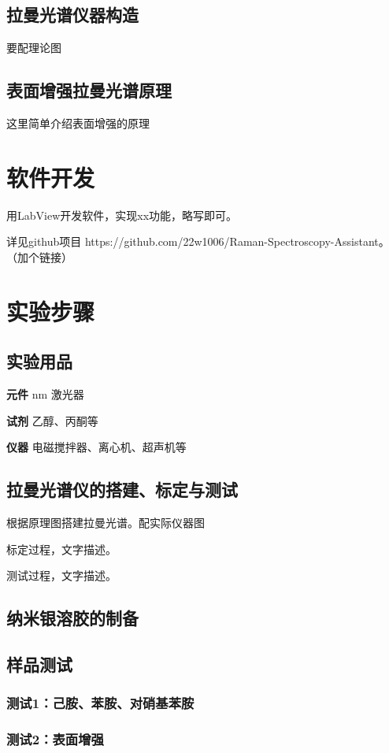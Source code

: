 \documentclass[UTF8]{article}
\begin{document}
	\subsection{拉曼光谱仪器构造}
	要配理论图

	\subsection{表面增强拉曼光谱原理}
	这里简单介绍表面增强的原理


	\section{软件开发}
	用LabView开发软件，实现xx功能，略写即可。
	
	详见github项目 https://github.com/22w1006/Raman-Spectroscopy-Assistant。（加个链接）
	
	
	\section{实验步骤}
	\subsection{实验用品}
	\textbf{元件}  nm 激光器
	
	\textbf{试剂} \quad 乙醇、丙酮等
	
	\textbf{仪器} \quad 电磁搅拌器、离心机、超声机等

	\subsection{拉曼光谱仪的搭建、标定与测试}
	根据原理图搭建拉曼光谱。配实际仪器图

	标定过程，文字描述。

	测试过程，文字描述。

	\subsection{纳米银溶胶的制备}

	\subsection{样品测试}
	\subsubsection{测试1：己胺、苯胺、对硝基苯胺}
	\subsubsection{测试2：表面增强}
\end{document}
